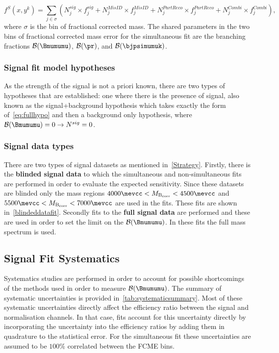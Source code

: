 \begin{equation}
f^{S}(x,y^{k})=\sum_{j\in{\sigma}}(N_{j}^{sig}\times f_{j}^{sig} + N_{j}^{MisID} \times f_{j}^{MisID} + N_{j}^{PartReco} \times f_{j}^{PartReco} + N_{j}^{Combi} \times f_{j}^{Combi}),
\label{eq:fullhypo2}
\end{equation}
where $\sigma$ is the bin of fractional corrected mass. The shared parameters in the two bins of fractional corrected mass error for the simultaneous fit are the branching fractions $\mathcal{B}(\Bmumumu)$, $\mathcal{B}(\pr)$, and $\mathcal{B}(\bjpsimumuk)$. 

\subsubsection{Signal fit model hypotheses}
As the strength of the signal is not a priori known, there are two types of hypotheses that are established: one where there is the presence of signal, also known as the signal+background hypothesis which takes exactly the form of~\autoref{eq:fullhypo} and then a background only hypothesis, where $\mathcal{B}(\Bmumumu)=0 \rightarrow N^{sig}=0$.

\subsubsection{Signal data types}

There are two types of signal datasets as mentioned in~\autoref{Strategy}. Firstly, there is the \textbf{blinded signal data} to which the simultaneous and non-simultaneous fits are performed in order to evaluate the expected sensitivity. Since these datasets are blinded only the mass regions $4000{\mevcc}<M_{\rm{B_{corr}}}<{4500\mevcc}$ and $5500{\mevcc}<M_{\rm{B_{corr}}}<{7000\mevcc}$ are used in the fits. These fits are shown in~\autoref{blindeddatafit}. Secondly fits to the \textbf{full signal data} are performed and these are used in order to set the limit on the $\mathcal{B}(\Bmumumu)$. In these fits the full mass spectrum is used.

\subsection{Signal Fit Systematics}
\label{systematics}
Systematics studies are performed in order to account for possible shortcomings of the methods used in order to measure $\mathcal{B}(\Bmumumu)$. The summary of systematic uncertainties is provided in~\autoref{tab:systematicsummary}. Most of these systematic uncertainties directly affect the efficiency ratio between the signal and normalisation channels. In that case, fits account for this uncertainty directly by incorporating the uncertainty into the efficiency ratios by adding them in quadrature to the statistical error. For the simultaneous fit these uncertainties are assumed to be $100\%$ correlated between the FCME bins.


